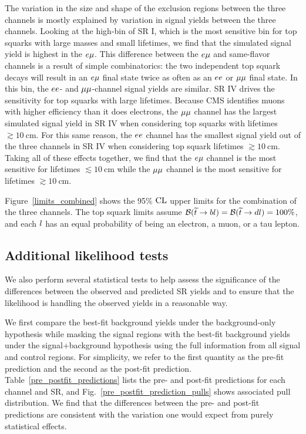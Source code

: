 The variation in the size and shape of the exclusion regions between the three channels is mostly explained by variation in signal yields between the three channels. Looking at the high-\pt bin of SR I, which is the most sensitive bin for top squarks with large masses and small lifetimes, we find that the simulated signal yield is highest in the $e{\mu}$. This difference between the $e{\mu}$ and same-flavor channels is a result of simple combinatorics: the two independent top squark decays will result in an $e{\mu}$ final state twice as often as an $ee$ or ${\mu}{\mu}$ final state. In this bin, the $ee$- and ${\mu}{\mu}$-channel signal yields are similar. SR IV drives the sensitivity for top squarks with large lifetimes. Because CMS identifies muons with higher efficiency than it does electrons, the ${\mu}{\mu}$ channel has the largest simulated signal yield in SR IV when considering top squarks with lifetimes $\gtrsim\SI{10}{\cm}$. For this same reason, the $ee$ channel has the smallest signal yield out of the three channels in SR IV when considering top squark lifetimes $\gtrsim\SI{10}{\cm}$. Taking all of these effects together, we find that the $e{\mu}$ channel is the most sensitive for lifetimes ${\lesssim}\SI{10}{\cm}$ while the ${\mu}{\mu}$ channel is the most sensitive for lifetimes ${\gtrsim}\SI{10}{\cm}$.

Figure~\ref{limits_combined} shows the 95\% $\text{CL}$ upper limits for the combination of the three channels. The top squark limits assume $\mathcal{B}(\widetilde{t} \to b l)=\mathcal{B}(\widetilde{t} \to d l)=100\%$, and each $l$ has an equal probability of being an electron, a muon, or a tau lepton.



\subsection{Additional likelihood tests}
We also perform several statistical tests to help assess the significance of the differences between the observed and predicted SR yields and to ensure that the likelihood is handling the observed yields in a reasonable way.

We first compare the best-fit background yields under the background-only hypothesis while masking the signal regions with the best-fit background yields under the signal+background hypothesis using the full information from all signal and control regions. For simplicity, we refer to the first quantity as the pre-fit prediction and the second as the post-fit prediction. Table~\ref{pre_postfit_predictions} lists the pre- and post-fit predictions for each channel and SR, and Fig.~\ref{pre_postfit_prediction_pulls} shows associated pull distribution. We find that the differences between the pre- and post-fit predictions are consistent with the variation one would expect from purely statistical effects.

